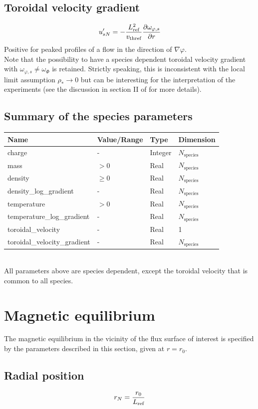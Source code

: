\documentclass[a4paper]{report}
\begin{document}
\subsection{Toroidal velocity gradient}
$$u'_{sN}=-\frac{L_{\textrm{ref}}^2}{v_\textrm{thref}}\frac{\partial \omega_{\varphi,s}}{\partial r}$$
Positive for peaked profiles of a flow in the direction of $\nabla \varphi$.\\
Note that the possibility to have a species dependent toroidal velocity gradient with $\omega_{\varphi,s}\neq \omega_\Phi$ is retained. Strictly speaking, this is inconsistent with the local limit assumption $\rho_*\rightarrow 0$ but can be interesting for the interpretation of the experiments (see the discussion in section II of \cite{Camenen:PoP2016} for more details).


\subsection{Summary of the species parameters}
\begin{tabularx}{\textwidth}{|X|Y|Y|Y|}
\hline
Name & Value/Range & Type & Dimension \\
\hline
charge & - & Integer & $N_\textrm{species}$ \\
mass & $>0$ & Real & $N_\textrm{species}$ \\
density & $\geq0$ & Real & $N_\textrm{species}$  \\
density\_log\_gradient & - & Real & $N_\textrm{species}$\\
temperature & $>0$ & Real & $N_\textrm{species}$ \\
temperature\_log\_gradient & - & Real & $N_\textrm{species}$ \\
toroidal\_velocity & - & Real & 1 \\
toroidal\_velocity\_gradient & - & Real & $N_\textrm{species}$  \\
\hline
\end{tabularx}\\
All parameters above are species dependent, except the toroidal velocity that is common to all species. 

\section{Magnetic equilibrium}
The magnetic equilibrium in the vicinity of the flux surface of interest is specified by the parameters described in this section, given at $r=r_0$.

\subsection{Radial position}
$$r_N=\frac{r_0}{L_{\textrm{ref}}}$$
\end{document}
